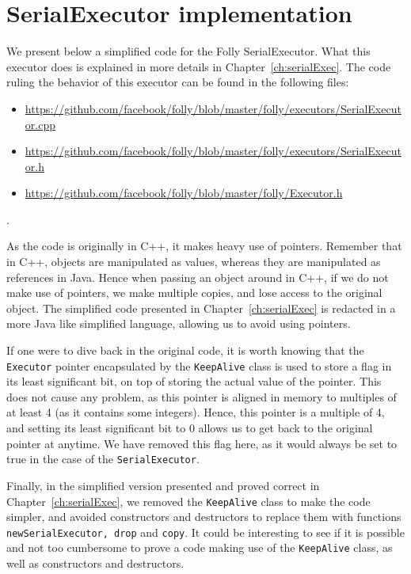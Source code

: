 \chapter{SerialExecutor implementation}
\label{app:serialExec}
We present below a simplified code for the Folly SerialExecutor. What this executor does is explained in more details in Chapter~\ref{ch:serialExec}. The code ruling the behavior of this executor can be found in the following files:
\begin{itemize}
	\item \url{https://github.com/facebook/folly/blob/master/folly/executors/SerialExecutor.cpp}
	\item \url{https://github.com/facebook/folly/blob/master/folly/executors/SerialExecutor.h}
	\item \url{https://github.com/facebook/folly/blob/master/folly/Executor.h}
\end{itemize}. 

As the code is originally in C++, it makes heavy use of pointers. Remember that in C++, objects are manipulated as values, whereas they are manipulated as references in Java. Hence when passing an object around in C++, if we do not make use of pointers, we make multiple copies, and lose access to the original object. The simplified code presented in Chapter~\ref{ch:serialExec} is redacted in a more Java like simplified language, allowing us to avoid using pointers.

If one were to dive back in the original code, it is worth knowing that the \texttt{Executor} pointer encapsulated by the \texttt{KeepAlive} class is used to store a flag in its least significant bit, on top of storing the actual value of the pointer. This does not cause any problem, as this pointer is aligned in memory to multiples of at least 4 (as it contains some integers). Hence, this pointer is a multiple of 4, and setting its least significant bit to 0 allows us to get back to the original pointer at anytime. We have removed this flag here, as it would always be set to true in the case of the \texttt{SerialExecutor}.

Finally, in the simplified version presented and proved correct in Chapter~\ref{ch:serialExec}, we removed the \texttt{KeepAlive} class to make the code simpler, and avoided constructors and destructors to replace them with functions \texttt{newSerialExecutor, drop} and \texttt{copy}. It could be interesting to see if it is possible and not too cumbersome to prove a code making use of the \texttt{KeepAlive} class, as well as constructors and destructors.


